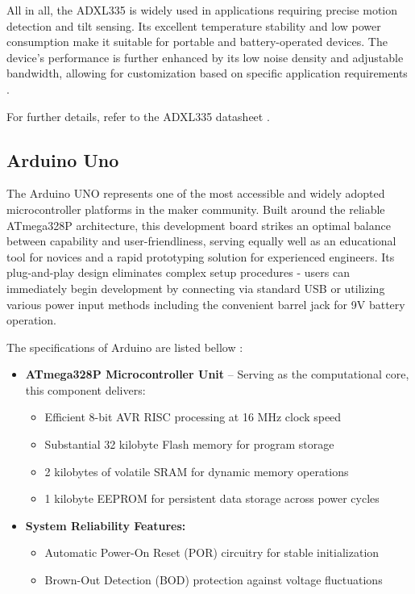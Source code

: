 {	All in all, the ADXL335 is widely used in applications requiring precise motion detection and tilt sensing. Its excellent temperature stability and low power consumption make it suitable for portable and battery-operated devices. The device's performance is further enhanced by its low noise density and adjustable bandwidth, allowing for customization based on specific application requirements \cite{ADXL335}.
	
	For further details, refer to the ADXL335 datasheet \cite{ADXL335}. 
		
}  


\subsection{Arduino Uno} 
{
	
	The Arduino UNO represents one of the most accessible and widely adopted microcontroller platforms in the maker community. Built around the reliable ATmega328P architecture, this development board strikes an optimal balance between capability and user-friendliness, serving equally well as an educational tool for novices and a rapid prototyping solution for experienced engineers. Its plug-and-play design eliminates complex setup procedures - users can immediately begin development by connecting via standard USB or utilizing various power input methods including the convenient barrel jack for 9V battery operation.
	
	The specifications of Arduino are listed bellow \cite{Arduino}:
	\begin{itemize}
		\item \textbf{ATmega328P Microcontroller Unit} -- Serving as the computational core, this component delivers:
		\begin{itemize}
			\item Efficient 8-bit AVR RISC processing at 16 MHz clock speed
			\item Substantial 32 kilobyte Flash memory for program storage
			\item 2 kilobytes of volatile SRAM for dynamic memory operations
			\item 1 kilobyte EEPROM for persistent data storage across power cycles
		\end{itemize}
		
		\item \textbf{System Reliability Features:}
		\begin{itemize}
			\item Automatic Power-On Reset (POR) circuitry for stable initialization
			\item Brown-Out Detection (BOD) protection against voltage fluctuations
		\end{itemize}
		

\end{itemize}}
